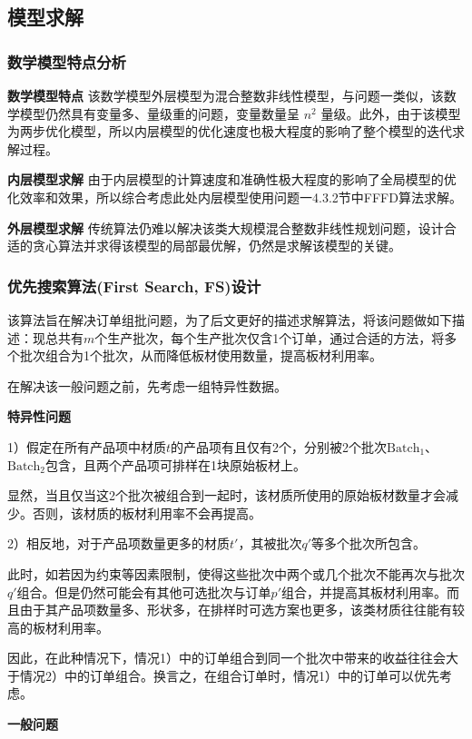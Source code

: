 \documentclass[bwprint]{gmcmthesis}
\begin{document}
\subsection{模型求解}
\subsubsection{数学模型特点分析}
	\textbf{数学模型特点} \quad 该数学模型外层模型为混合整数非线性模型，与问题一类似，该数学模型仍然具有变量多、量级重的问题，变量数量呈 $ n^2 $ 量级。此外，由于该模型为两步优化模型，所以内层模型的优化速度也极大程度的影响了整个模型的迭代求解过程。
	
	\textbf{内层模型求解} \quad 由于内层模型的计算速度和准确性极大程度的影响了全局模型的优化效率和效果，所以综合考虑此处内层模型使用问题一4.3.2节中FFFD算法求解。
	
	\textbf{外层模型求解} \quad 传统算法仍难以解决该类大规模混合整数非线性规划问题，设计合适的贪心算法并求得该模型的局部最优解，仍然是求解该模型的关键。

\subsubsection{优先搜索算法(First Search, FS)设计}
该算法旨在解决订单组批问题，为了后文更好的描述求解算法，将该问题做如下描述：现总共有$m$个生产批次，每个生产批次仅含1个订单，通过合适的方法，将多个批次组合为1个批次，从而降低板材使用数量，提高板材利用率。

在解决该一般问题之前，先考虑一组特异性数据。

\textbf{特异性问题}

1）假定在所有产品项中材质$t$的产品项有且仅有2个，分别被2个批次$\text{Batch}_1$、$\text{Batch}_2$包含，且两个产品项可排样在1块原始板材上。

显然，当且仅当这2个批次被组合到一起时，该材质所使用的原始板材数量才会减少。否则，该材质的板材利用率不会再提高。

2）相反地，对于产品项数量更多的材质$t'$，其被批次$q'$等多个批次所包含。

此时，如若因为约束等因素限制，使得这些批次中两个或几个批次不能再次与批次$q'$组合。但是仍然可能会有其他可选批次与订单$p'$组合，并提高其板材利用率。而且由于其产品项数量多、形状多，在排样时可选方案也更多，该类材质往往能有较高的板材利用率。

因此，在此种情况下，情况1）中的订单组合到同一个批次中带来的收益往往会大于情况2）中的订单组合。换言之，在组合订单时，情况1）中的订单可以优先考虑。

\textbf{一般问题}
\end{document}
